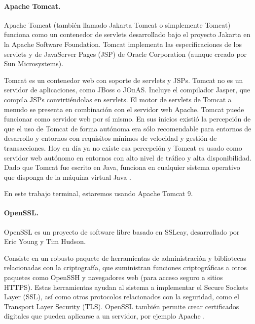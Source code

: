 \documentclass[12pt, a4paper, titlepage]{report}
\begin{document}
		    \paragraph{Apache Tomcat.\\}
		    Apache Tomcat (también llamado Jakarta Tomcat o simplemente Tomcat) funciona como un contenedor de servlets desarrollado bajo el proyecto Jakarta en la Apache Software Foundation. Tomcat implementa las especificaciones de los servlets y de JavaServer Pages (JSP) de Oracle Corporation (aunque creado por Sun Microsystems).
		    
		    Tomcat es un contenedor web con soporte de servlets y JSPs. Tomcat no es un servidor de aplicaciones, como JBoss o JOnAS. Incluye el compilador Jasper, que compila JSPs convirtiéndolas en servlets. El motor de servlets de Tomcat a menudo se presenta en combinación con el servidor web Apache. Tomcat puede funcionar como servidor web por sí mismo. En sus inicios existió la percepción de que el uso de Tomcat de forma autónoma era sólo recomendable para entornos de desarrollo y entornos con requisitos mínimos de velocidad y gestión de transacciones. Hoy en día ya no existe esa percepción y Tomcat es usado como servidor web autónomo en entornos con alto nivel de tráfico y alta disponibilidad. Dado que Tomcat fue escrito en Java, funciona en cualquier sistema operativo que disponga de la máquina virtual Java \cite{refTomcat}.
		    
		    En este trabajo terminal, estaremos usando Apache Tomcat 9.
		    
		    \paragraph{OpenSSL.\\}
		    OpenSSL es un proyecto de software libre basado en SSLeay, desarrollado por Eric Young y Tim Hudson.
            
            Consiste en un robusto paquete de herramientas de administración y bibliotecas relacionadas con la criptografía, que suministran funciones criptográficas a otros paquetes como OpenSSH y navegadores web (para acceso seguro a sitios HTTPS). Estas herramientas ayudan al sistema a implementar el Secure Sockets Layer (SSL), así como otros protocolos relacionados con la seguridad, como el Transport Layer Security (TLS). OpenSSL también permite crear certificados digitales que pueden aplicarse a un servidor, por ejemplo Apache \cite{opensslmillones}.
            
\end{document}
